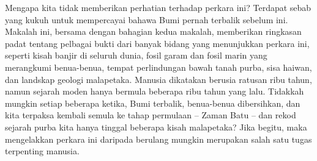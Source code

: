 \documentclass[10pt,twocolumn,letterpaper]{article}
\begin{document}
Mengapa kita tidak memberikan perhatian terhadap perkara ini? Terdapat sebab yang kukuh untuk mempercayai bahawa Bumi pernah terbalik sebelum ini. Makalah ini, bersama dengan bahagian kedua makalah, memberikan ringkasan padat tentang pelbagai bukti dari banyak bidang yang menunjukkan perkara ini, seperti kisah banjir di seluruh dunia, fosil garam dan fosil marin yang merangkumi benua-benua, tempat perlindungan bawah tanah purba, sisa haiwan, dan landskap geologi malapetaka. Manusia dikatakan berusia ratusan ribu tahun, namun sejarah moden hanya bermula beberapa ribu tahun yang lalu. Tidakkah mungkin setiap beberapa ketika, Bumi terbalik, benua-benua dibersihkan, dan kita terpaksa kembali semula ke tahap permulaan – Zaman Batu – dan rekod sejarah purba kita hanya tinggal beberapa kisah malapetaka? Jika begitu, maka mengelakkan perkara ini daripada berulang mungkin merupakan salah satu tugas terpenting manusia.
\end{document}
